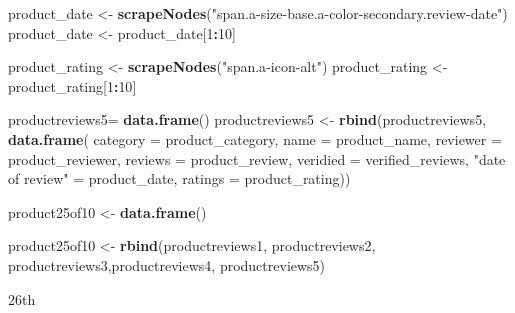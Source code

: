 \documentclass[
]{article}
\newenvironment{Shaded}{\begin{snugshade}}{\end{snugshade}}
\newcommand{\AttributeTok}[1]{\textcolor[rgb]{0.13,0.29,0.53}{#1}}
\newcommand{\DecValTok}[1]{\textcolor[rgb]{0.00,0.00,0.81}{#1}}
\newcommand{\FunctionTok}[1]{\textcolor[rgb]{0.13,0.29,0.53}{\textbf{#1}}}
\newcommand{\NormalTok}[1]{#1}
\newcommand{\OtherTok}[1]{\textcolor[rgb]{0.56,0.35,0.01}{#1}}
\newcommand{\SpecialCharTok}[1]{\textcolor[rgb]{0.81,0.36,0.00}{\textbf{#1}}}
\newcommand{\StringTok}[1]{\textcolor[rgb]{0.31,0.60,0.02}{#1}}
\begin{document}
\begin{Shaded}
\begin{Highlighting}[]
\NormalTok{  product\_date }\OtherTok{\textless{}{-}} \FunctionTok{scrapeNodes}\NormalTok{(}\StringTok{"span.a{-}size{-}base.a{-}color{-}secondary.review{-}date"}\NormalTok{)}
\NormalTok{  product\_date }\OtherTok{\textless{}{-}}\NormalTok{ product\_date[}\DecValTok{1}\SpecialCharTok{:}\DecValTok{10}\NormalTok{]}
  
\NormalTok{  product\_rating }\OtherTok{\textless{}{-}} \FunctionTok{scrapeNodes}\NormalTok{(}\StringTok{"span.a{-}icon{-}alt"}\NormalTok{)}
\NormalTok{  product\_rating }\OtherTok{\textless{}{-}}\NormalTok{ product\_rating[}\DecValTok{1}\SpecialCharTok{:}\DecValTok{10}\NormalTok{]}
  
\NormalTok{  productreviews5}\OtherTok{=} \FunctionTok{data.frame}\NormalTok{()}
\NormalTok{  productreviews5 }\OtherTok{\textless{}{-}} \FunctionTok{rbind}\NormalTok{(productreviews5, }\FunctionTok{data.frame}\NormalTok{(}
                      \AttributeTok{category =}\NormalTok{ product\_category,}
                      \AttributeTok{name =}\NormalTok{ product\_name,}
                      \AttributeTok{reviewer =}\NormalTok{ product\_reviewer,}
                      \AttributeTok{reviews =}\NormalTok{ product\_review,}
                      \AttributeTok{veridied =}\NormalTok{ verified\_reviews,}
                      \StringTok{"date of review"} \OtherTok{=}\NormalTok{ product\_date,}
                      \AttributeTok{ratings =}\NormalTok{ product\_rating))}
  
\NormalTok{  product25of10 }\OtherTok{\textless{}{-}} \FunctionTok{data.frame}\NormalTok{()}
  
\NormalTok{  product25of10 }\OtherTok{\textless{}{-}} \FunctionTok{rbind}\NormalTok{(productreviews1, productreviews2, productreviews3,productreviews4, productreviews5)}
\end{Highlighting}
\end{Shaded}

26th
\end{document}
